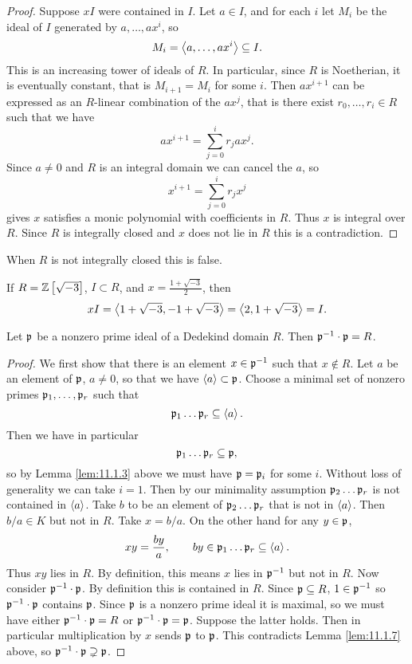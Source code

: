 \begin{proof}
Suppose $ xI $ were contained in $ I $. Let $ a \in I $, and for each $ i $ let $ M_i $ be the ideal of $ I $ generated by $ a, \dots, ax^i $, so
$$ M_i = \left\langle a, \dots, ax^i \right\rangle \subseteq I. $$
This is an increasing tower of ideals of $ R $. In particular, since $ R $ is Noetherian, it is eventually constant, that is $ M_{i + 1} = M_i $ for some $ i $. Then $ ax^{i + 1} $ can be expressed as an $ R $-linear combination of the $ ax^j $, that is there exist $ r_0, \dots, r_i \in R $ such that we have
$$ ax^{i + 1} = \sum_{j = 0}^i r_jax^j. $$
Since $ a \ne 0 $ and $ R $ is an integral domain we can cancel the $ a $, so
$$ x^{i + 1} = \sum_{j = 0}^i r_jx^j $$
gives $ x $ satisfies a monic polynomial with coefficients in $ R $. Thus $ x $ is integral over $ R $. Since $ R $ is integrally closed and $ x $ does not lie in $ R $ this is a contradiction.
\end{proof}

When $ R $ is not integrally closed this is false.

\pagebreak

\begin{example*}
If $ R = \mathbb{Z}\left[ \sqrt{-3} \right] $, $ I \subset R $, and $ x = \tfrac{1 + \sqrt{-3}}{2} $, then
$$ xI = \left\langle 1 + \sqrt{-3}, -1 + \sqrt{-3} \right\rangle = \left\langle 2, 1 + \sqrt{-3} \right\rangle = I. $$
\end{example*}

\begin{proposition}
\label{prop:11.1.8}
Let $ \mathfrak{p} $ be a nonzero prime ideal of a Dedekind domain $ R $. Then $ \mathfrak{p}^{-1} \cdot \mathfrak{p} = R $.
\end{proposition}

\begin{proof}
We first show that there is an element $ x \in \mathfrak{p}^{-1} $ such that $ x \notin R $. Let $ a $ be an element of $ \mathfrak{p} $, $ a \ne 0 $, so that we have $ \left\langle a \right\rangle \subset \mathfrak{p} $. Choose a minimal set of nonzero primes $ \mathfrak{p}_1, \dots, \mathfrak{p}_r $ such that
$$ \mathfrak{p}_1 \dots \mathfrak{p}_r \subseteq \left\langle a \right\rangle. $$
Then we have in particular
$$ \mathfrak{p}_1 \dots \mathfrak{p}_r \subseteq \mathfrak{p}, $$
so by Lemma \ref{lem:11.1.3} above we must have $ \mathfrak{p} = \mathfrak{p}_i $ for some $ i $. Without loss of generality we can take $ i = 1 $. Then by our minimality assumption $ \mathfrak{p}_2 \dots \mathfrak{p}_r $ is not contained in $ \left\langle a \right\rangle $. Take $ b $ to be an element of $ \mathfrak{p}_2 \dots \mathfrak{p}_r $ that is not in $ \left\langle a \right\rangle $. Then $ b / a \in K $ but not in $ R $. Take $ x = b / a $. On the other hand for any $ y \in \mathfrak{p} $,
$$ xy = \dfrac{by}{a}, \qquad by \in \mathfrak{p}_1 \dots \mathfrak{p}_r \subseteq \left\langle a \right\rangle. $$
Thus $ xy $ lies in $ R $. By definition, this means $ x $ lies in $ \mathfrak{p}^{-1} $ but not in $ R $. Now consider $ \mathfrak{p}^{-1} \cdot \mathfrak{p} $. By definition this is contained in $ R $. Since $ \mathfrak{p} \subseteq R $, $ 1 \in \mathfrak{p}^{-1} $ so $ \mathfrak{p}^{-1} \cdot \mathfrak{p} $ contains $ \mathfrak{p} $. Since $ \mathfrak{p} $ is a nonzero prime ideal it is maximal, so we must have either $ \mathfrak{p}^{-1} \cdot \mathfrak{p} = R $ or $ \mathfrak{p}^{-1} \cdot \mathfrak{p} = \mathfrak{p} $. Suppose the latter holds. Then in particular multiplication by $ x $ sends $ \mathfrak{p} $ to $ \mathfrak{p} $. This contradicts Lemma \ref{lem:11.1.7} above, so $ \mathfrak{p}^{-1} \cdot \mathfrak{p} \supsetneq \mathfrak{p} $.
\end{proof}

